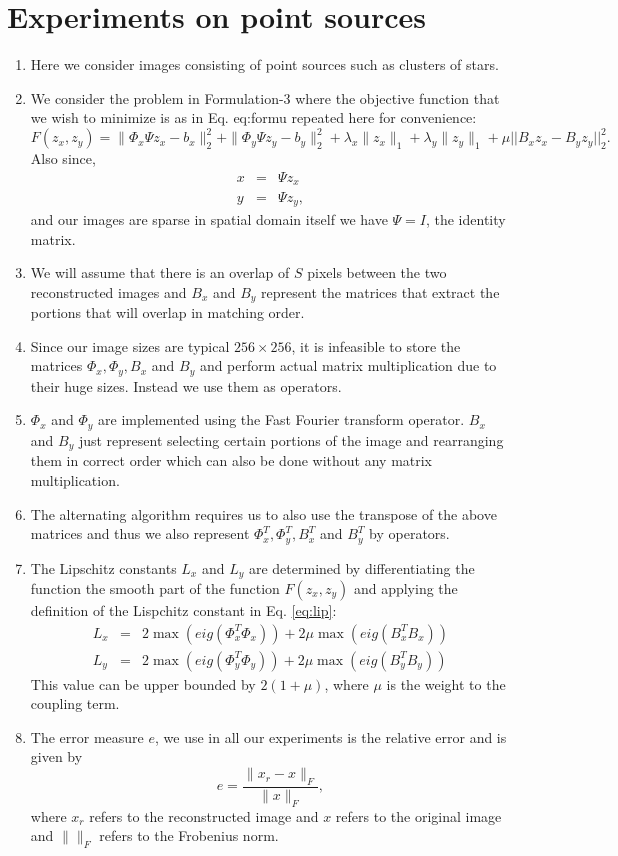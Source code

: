\section{Experiments on point sources}
\begin{enumerate}
\item Here we consider images consisting of point sources such as clusters of stars.
\item We consider the problem in Formulation-3 where the objective function that we wish to minimize is as in Eq. {eq:formu} repeated here for convenience:
 \begin{equation}
 F(z_x, z_y) = \|\Phi_x\Psi z_x - b_x\|_2^2 + \|\Phi_y\Psi z_y - b_y\|_2^2 + \lambda_x \|z_x\|_1 + \lambda_y \|z_y\|_1 + \mu || B_x z_x - B_y z_y||_2^2.
 \end{equation}
 Also since,
\begin{eqnarray}
	x &=& \Psi z_x 	\label{eq:domainx}\\
	y &=& \Psi z_y,
	\label{eq:domainy}
\end{eqnarray}
and our images are sparse in spatial domain itself we have $\Psi = I$, the identity matrix.
\item We will assume that there is an overlap of $S$ pixels between the two reconstructed images and $B_x$ and $B_y$ represent the matrices that extract the portions that will overlap in matching order.
\item Since our image sizes are typical $256 \times 256$, it is infeasible to store the matrices $\Phi_x, \Phi_y,  B_x $ and $B_y$ and perform actual matrix multiplication due to their huge sizes. Instead we use them as operators.
\item $\Phi_x$ and $\Phi_y$ are implemented using the Fast Fourier transform operator. $B_x$ and $B_y$ just represent selecting certain portions of the image and rearranging them in correct order which can also be done without any matrix multiplication.
\item The alternating algorithm requires us to also use the transpose of the above matrices and thus we also represent $\Phi_x^T, \Phi_y^T, B_x^T$ and $B_y^T$ by operators.
\item The Lipschitz constants $L_x$ and $L_y$ are determined by differentiating the function the smooth part of the function $F(z_x, z_y)$ and applying the definition of the Lispchitz constant in Eq. \ref{eq:lip}:
\begin{eqnarray}
L_x &=& 2\max(eig( \Phi_x^T \Phi_x))  +  2 \mu \max(eig( B_x^T B_x)) \\
L_y &=& 2\max(eig( \Phi_y^T \Phi_y))  +  2\mu \max(eig( B_y^T B_y))
\end{eqnarray}This value can be upper bounded by $2(1 + \mu)$, where $\mu$ is the weight to the coupling term.
\item The error measure $e$, we use in all our experiments is the relative error and is given by
\begin{equation}
	e = \frac{\|x_r - x\|_F}{\|x \|_F},
\end{equation}
where $x_r$ refers to the reconstructed image and $x$ refers to the original image and $\| \|_F$ refers to the Frobenius norm.

\end{enumerate}
